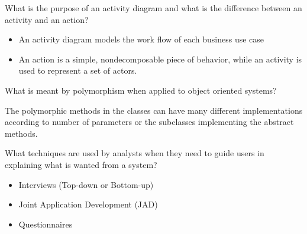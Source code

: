 \documentclass[10pt,a4paper]{exam}
\begin{document}
\begin{questions}
\begin{solution}
\begin{itemize}
\end{itemize}
\end{solution}


\question What is the purpose of an activity diagram and what is the difference between an activity and an action?
\begin{solution}
\begin{itemize}

        \item An activity diagram models the work flow of each business use case
        \item An action is a simple, nondecomposable piece of behavior, while an activity is used to represent a set of actors.

\end{itemize}
\end{solution}


\question What is meant by polymorphism when applied to object oriented systems?
\begin{solution}

        The polymorphic methods in the classes can have many different implementations according to number of parameters or the subclasses implementing the abstract methods.

\end{solution}


\question What techniques are used by analysts when they need to guide users in explaining what is wanted from a system?
\begin{solution}
\begin{itemize}

        \item Interviews (Top-down or Bottom-up)
        \item Joint Application Development (JAD)
        \item Questionnaires

\end{itemize}
\end{solution}


\end{questions}
\end{document}
